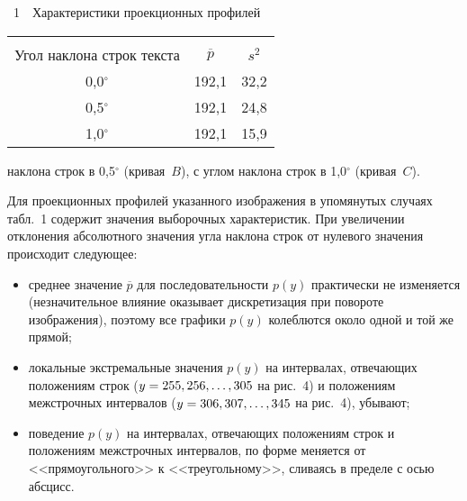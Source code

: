 \begin{multicols}{2}

\addtocounter{figure}{1}

\noindent
\begin{center}
{{\tablename~1}\ \ \small{Характеристики проекционных профилей}}
\end{center}

{\small
      \begin{center}
      \tabcolsep=14pt
      \begin{tabular}{|c|c|c|}
      \hline
      &&\\[-9pt]
Угол наклона строк текста&$\overline{p}$&$s^2$\\
\hline
0,0$^\circ$&192,1&32,2\\
0,5$^\circ$&192,1&24,8\\
1,0$^\circ$&192,1&15,9\\
\hline
\end{tabular}
\end{center}}

\vspace*{12pt}
\addtocounter{table}{1}


\noindent
 наклона строк в 0,5$^\circ$ 
(кривая~$B$), с углом наклона строк в 1,0$^\circ$ (кривая~$C$). 

      

      
      Для проекционных профилей указанного изоб\-ра\-же\-ния в упомянутых случаях 
табл.~1 содержит значения выборочных характеристик. При увеличении отклонения 
абсолютного значения угла наклона строк от нулевого значения происходит следующее:
    \begin{itemize}
\item среднее значение $\overline{p}$ для последовательности $p(y)$ практически не 
изменяется (незначительное
влияние оказывает дискретизация при повороте 
изображения), поэтому все графики $p(y)$ колеблются около одной и той же прямой;
\item локальные экстремальные значения $p(y)$ на интервалах, отвечающих 
положениям строк ($y\hm=255, 256, \ldots, 305$ на рис.~4) и положениям межстрочных 
интервалов ($y\hm=306, 307, \ldots , 345$ на рис.~4), убывают;
\item поведение $p(y)$ на интервалах, отвечающих положениям строк и положениям 
межстрочных интервалов, по форме меняется от <<прямоугольного>> к 
<<треугольному>>, сливаясь в пределе с осью абсцисс.
\end{itemize}




\end{multicols}
